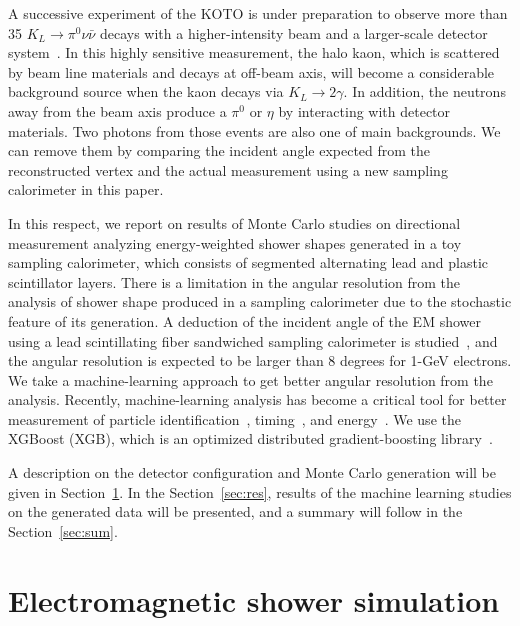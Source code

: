 \documentclass[12pt,times,draftclsnofoot,a4paper]{elsarticle}
\begin{document}
A successive experiment of the KOTO is under preparation to observe more than 35 $K_{L} \rightarrow \pi^{0}\nu\bar{\nu}$ decays with a higher-intensity beam and a larger-scale detector system~\cite{KOTO2}. In this highly sensitive measurement, the halo kaon, which is scattered by beam line materials and decays at off-beam axis, will become a considerable background source when the kaon decays via $K_{L} \rightarrow 2\gamma$. In addition, the neutrons away from the beam axis produce a $\pi^{0}$ or $\eta$ by interacting with detector materials. Two photons from those events are also one of main backgrounds. We can remove them by comparing the incident angle expected from the reconstructed vertex and the actual measurement using a new sampling calorimeter in this paper.

In this respect, we report on results of Monte Carlo studies on directional measurement analyzing energy-weighted shower shapes generated in a toy sampling calorimeter, which consists of segmented alternating lead and plastic scintillator layers. There is a limitation in the angular resolution from the analysis of shower shape produced in a sampling calorimeter due to the stochastic feature of its generation. A deduction of the incident angle of the EM shower using a lead scintillating fiber sandwiched sampling calorimeter is studied~\cite{PbScint}, and the angular resolution is expected to be larger than 8 degrees for 1-GeV electrons. We take a machine-learning approach to get better angular resolution from the analysis. Recently, machine-learning analysis has become a critical tool for better measurement of particle identification~\cite{mlp}, timing~\cite{mlt}, and energy~\cite{mle}. We use the XGBoost (XGB), which is an optimized distributed gradient-boosting library~\cite{xgboost:2016}.

A description on the detector configuration and Monte Carlo generation will be given in Section~\ref{sec:ems}. In the Section~\ref{sec:res}, results of the machine learning studies on the generated data will be presented, and a summary will follow in the Section~\ref{sec:sum}. 

\section{Electromagnetic shower simulation}
\label{sec:ems}
\end{document}
